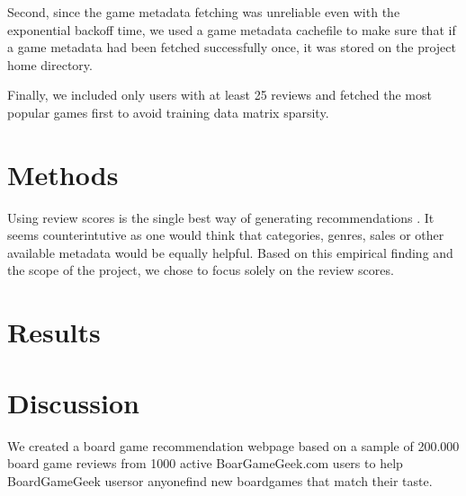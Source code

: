 \documentclass[a4paper,12pt,bibliography=totoc,numbers=noenddot,sfdefaults=false,abstract=true,notitlepage]{scrartcl} %
\begin{document}
	Second, since the game metadata fetching was unreliable even with the exponential backoff time, we used a game metadata cachefile to make sure that if a game metadata had been fetched successfully once, it was stored  on the project home directory.

	Finally, we included only users with at least 25 reviews and fetched the most popular games first to avoid training data matrix sparsity.
	
	
	\section{Methods}\label{methods}

	Using review scores is the single best way of generating recommendations \autocite{epsteinRangeWhyGeneralists2021}. It seems counterintutive as one would think that categories, genres, sales or other available metadata would be equally helpful. Based on this empirical finding and the scope of the project, we chose to focus solely on the review scores.

	
	
	
	\section{Results}\label{results}
	
	
	
	
	
	
	
	
	
	
	\section{Discussion}\label{discussion}

	We created a board game recommendation webpage based on a sample of 200.000 board game reviews from 1000 active BoarGameGeek.com users to help BoardGameGeek users\textemdash or anyone\textemdash find new boardgames that match their taste.
	
	
	
	
	
\end{document}
